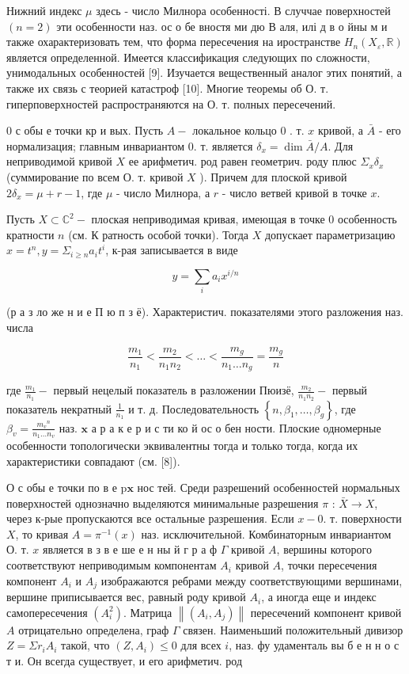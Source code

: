 \documentclass[10pt]{article}
\begin{document}
Нижний индекс $\mu$ здесь - число Милнора особенності. В случчае поверхностей $(n=2)$ эти особенности наз. ос о бе вностя ми дю В аля, илі д в о йны м и также охарактеризовать тем, что форма пересечения на иространстве $H_{n}\left(X_{\varepsilon}, \mathbb{R}\right)$ является определенной. Имеется классификация следующих по сложности, унимодальных особенностей [9]. Изучается вещественный аналог этих понятий, а также их связь с теорией катастроф [10]. Многие теоремы об О. т. гиперповерхностей распространяются на О. т. полных пересечений.

0 с обы е точки кр и вых. Пусть $A-$ локальное кольцо 0 . т. $x$ кривой, а $\bar{A}$ - его нормализация; главным инвариантом 0. т. является $\delta_{x}=\operatorname{dim} \bar{A} / A$. Для неприводимой кривой $X$ ее арифметич. род равен геометрич. роду плюс $\Sigma_{x} \delta_{x}$ (суммирование по всем О. т. кривой $X$ ). Причем для плоской кривой $2 \delta_{x}=\mu+r-1$, где $\mu$ - число Милнора, а $r$ - число ветвей кривой в точке $x$.

Пусть $X \subset \mathbb{C}^{2}-$ плоская неприводимая кривая, имеющая в точке 0 особенность кратности $n$ (см. К ратность особой точки). Тогда $X$ допускает параметризацию $x=t^{n}, y=\Sigma_{i \geqslant n} a_{i} t^{i}$, к-рая записывается в виде

\[
y=\sum_{i} a_{i} x^{i / n}
\]

(р а з ло же н и е П ю п з ё). Характеристич. показателями этого разложения наз. числа

\[
\frac{m_{1}}{n_{1}}<\frac{m_{2}}{n_{1} n_{2}}<\ldots<\frac{m_{g}}{n_{1} \ldots n_{g}}=\frac{m_{g}}{n}
\]

где $\frac{m_{1}}{n_{1}}-$ первый нецелый показатель в разложении Пюизё, $\frac{m_{2}}{n_{1} n_{2}}-$ первый показатель некратный $\frac{1}{n_{1}}$ и т. д. Последовательность $\left\{n, \beta_{1}, \ldots, \beta_{g}\right\}$, где $\beta_{v}=\frac{m_{v}{ }^{n}}{n_{1} \ldots n_{v}}$ наз. $\mathbf{x}$ а р а к е р и с ти ко й ос о бен ности. Плоские одномерные особенности топологически эквивалентны тогда и только тогда, когда их характеристики совпадают (см. [8]).

О с обы е точки по в е $\mathrm{p} \mathbf{x}$ нос тей. Среди разрешений особенностей нормальных поверхностей однозначно выделяются минимальные разрешения $\pi$ : $\bar{X} \rightarrow X$, через к-рые пропускаются все остальные разрешения. Если $x-0$. т. поверхности $X$, то кривая $A=\pi^{-1}(x)$ наз. исключительной. Комбинаторным инвариантом О. т. $x$ является в з в е ше е н ны й г р а ф $\Gamma$ кривой $A$, вершины которого соответствуют неприводимым компонентам $A_{i}$ кривой $A$, точки пересечения компонент $A_{i}$ и $A_{j}$ изображаются ребрами между соответствующими вершинами, вершине приписывается вес, равный роду кривой $A_{i}$, а иногда еще и индекс самопересечения $\left(A_{i}^{2}\right)$. Матрица $\left\|\left(A_{i}, A_{j}\right)\right\|$ пересечений компонент кривой $A$ отрицательно определена, граф $\Gamma$ связен. Наименьший положительный дивизор $Z=\Sigma r_{i} A_{i}$ такой, что $\left(Z, A_{i}\right) \leqslant 0$ для всех $i$, наз. фу удаменталь вы б е н н о с т и. Он всегда существует, и его арифметич. род
\end{document}

